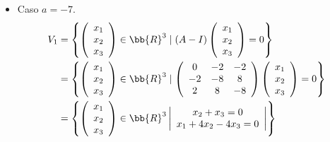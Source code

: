 \begin{ejercicio}
\begin{itemize}
       \item Caso $a=-7$.
           \begin{equation*}\begin{split}
               V_{1} & = \left\{ \left(\begin{array}{c}
                    x_1 \\
                    x_2 \\
                    x_3
               \end{array}\right) \in \bb{R}^3 \mid (A-I)\left(\begin{array}{c}
                    x_1 \\
                    x_2 \\
                    x_3
               \end{array}\right) = 0 \right\} \\
               & = \left\{ \left(\begin{array}{c}
                    x_1 \\
                    x_2 \\
                    x_3
               \end{array}\right) \in \bb{R}^3 \mid \left( \begin{array}{ccc}
                0 & -2 & -2 \\
                -2 & -8 & 8 \\
                2 & 8 & -8 \\
            \end{array}\right) \left(\begin{array}{c}
                    x_1 \\
                    x_2 \\
                    x_3
               \end{array}\right) = 0 \right\} \\
               & = \left\{ \left(\begin{array}{c}
                    x_1 \\
                    x_2  \\
                    x_3
               \end{array}\right) \in \bb{R}^3 \left| \begin{array}{c}
                    x_2+x_3=0 \\
                    x_1+4x_2-4x_3 = 0
               \end{array}\right| \right\}
           \end{split}\end{equation*}

\end{itemize}
\end{ejercicio}

